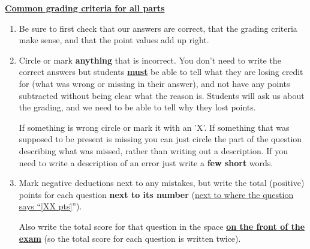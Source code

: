 \documentclass[11pt,fleqn]{article}
\begin{document}

  {

    \setlength{\leftmargini}{5mm}

    \vspace*{-6mm}

    \begin{info}{\textbf{\underline{\Large Common grading criteria for all
                 parts}}}

      \vspace*{-2mm}

      \enlargethispage{6mm}

      \setlength{\leftmarginii}{5mm}

      \begin{enumerate}

        \addtolength{\itemsep}{.5mm}

        \item Be sure to first check that our answers are correct, that the
              grading criteria make sense, and that the point values add up
              right.

        \item Circle or mark \textbf{anything} that is incorrect.  You don't
              need to write the correct answers but students
              \textbf{\underline{must}} be able to tell what they are losing
              credit for (what was wrong or missing in their answer), and not
              have any points subtracted without being clear what the reason
              is.  Students will ask us about the grading, and we need to be
              able to tell why they lost points.

              If something is wrong circle or mark it with an 'X'.  If
              something that was supposed to be present is missing you can
              just circle the part of the question describing what was missed,
              rather than writing out a description.  If you need to write a
              description of an error just write a \textbf{few short} words.

        \item Mark negative deductions next to any mistakes, but write the
              total (positive) points for each question \textbf{next to its
              number} (\underline{next to where the question says ``[XX
              pts\.]}'').

              Also write the total score for that question in the space
              \textbf{\underline{on the front of the exam}} (so the total
              score for each question is written twice).


\end{enumerate}
\end{info}}
\end{document}
